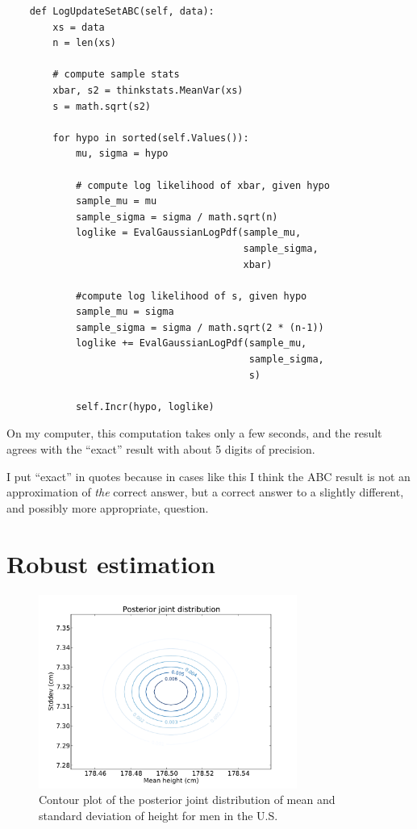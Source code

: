 \documentclass[12pt]{book}
\begin{document}
\begin{verbatim}
    def LogUpdateSetABC(self, data):
        xs = data
        n = len(xs)

        # compute sample stats
        xbar, s2 = thinkstats.MeanVar(xs)
        s = math.sqrt(s2)

        for hypo in sorted(self.Values()):
            mu, sigma = hypo

            # compute log likelihood of xbar, given hypo
            sample_mu = mu
            sample_sigma = sigma / math.sqrt(n)
            loglike = EvalGaussianLogPdf(sample_mu, 
                                         sample_sigma,
                                         xbar)

            #compute log likelihood of s, given hypo
            sample_mu = sigma
            sample_sigma = sigma / math.sqrt(2 * (n-1))
            loglike += EvalGaussianLogPdf(sample_mu, 
                                          sample_sigma,
                                          s)

            self.Incr(hypo, loglike)
\end{verbatim}

On my computer, this computation takes only a few seconds,
and the result agrees with the ``exact'' result with about 5 digits of
precision.

I put ``exact'' in quotes because in cases like this I think the ABC
result is not an approximation of {\em the} correct answer, but a
correct answer to a slightly different, and possibly more appropriate,
question.


\section{Robust estimation}

\begin{figure}
\centerline{\includegraphics[height=2.5in]{figs/variability_posterior_male.pdf}}
\caption{Contour plot of the posterior joint distribution of
mean and standard deviation of height for men in the U.S.}
\label{fig.variability1}
\end{figure}
\end{document}

